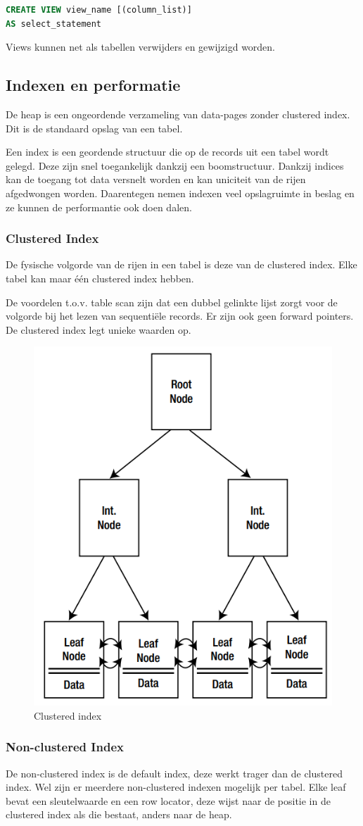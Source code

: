 \documentclass[a4paper,12pt]{article}
\begin{document}
\begin{lstlisting}[language=sql, breaklines=true]
CREATE VIEW view_name [(column_list)]
AS select_statement
\end{lstlisting}

Views kunnen net als tabellen verwijders en gewijzigd worden.

\subsection{Indexen en performatie}
De heap is een ongeordende verzameling van data-pages zonder clustered index. Dit is de standaard opslag van een tabel.

Een index is een geordende structuur die op de records uit een tabel wordt gelegd.
Deze zijn snel toegankelijk dankzij een boomstructuur.
Dankzij indices kan de toegang tot data versnelt worden en kan uniciteit van de rijen afgedwongen worden.
Daarentegen nemen indexen veel opslagruimte in beslag en ze kunnen de performantie ook doen dalen.

\subsubsection{Clustered Index}
De fysische volgorde van de rijen in een tabel is deze van de clustered index.
Elke tabel kan maar één clustered index hebben.

De voordelen t.o.v. table scan zijn dat  een dubbel gelinkte lijst zorgt voor de volgorde bij het lezen van sequentiële records.
Er zijn ook geen forward pointers.
De clustered index legt unieke waarden op.

\begin{figure}[H]
\centering
  	\includegraphics[width=.35\linewidth]{img/ClusteredIndex.png}
  	\caption{Clustered index}
  	\label{fig:ClusteredIndex}
\end{figure}

\subsubsection{Non-clustered Index}
De non-clustered index is de default index, deze werkt trager dan de clustered index.
Wel zijn er meerdere non-clustered indexen mogelijk per tabel.
Elke leaf bevat een sleutelwaarde en een row locator, deze wijst naar de positie in de clustered index als die bestaat, anders naar de heap.
\end{document}
